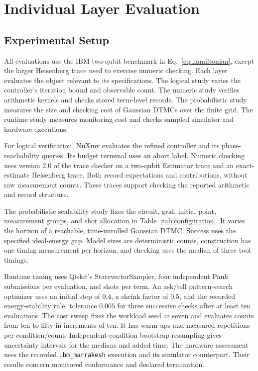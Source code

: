 \documentclass[conference]{IEEEtran}
\begin{document}
\section{Individual Layer Evaluation}
\label{sec:individual}
\subsection{Experimental Setup}
All evaluations use the IBM two-qubit benchmark in Eq.~\eqref{eq:hamiltonian}, except the larger Heisenberg trace used to exercise numeric checking. Each layer evaluates the object relevant to its specifications. The logical study varies the controller's iteration bound and observable count. The numeric study verifies arithmetic kernels and checks stored term-level records. The probabilistic study measures the size and checking cost of Gaussian DTMCs over the finite grid. The runtime study measures monitoring cost and checks sampled simulator and hardware executions.

For logical verification, NuXmv evaluates the refined controller and its phase-reachability queries. Its budget terminal uses an abort label. Numeric checking uses version 2.0 of the trace checker on a two-qubit Estimator trace and an exact-estimate Heisenberg trace. Both record expectations and contributions, without raw measurement counts. These traces support checking the reported arithmetic and record structure.

The probabilistic scalability study fixes the circuit, grid, initial point, measurement groups, and shot allocation in Table~\ref{tab:configuration}. It varies the horizon of a reachable, time-unrolled Gaussian DTMC. Success uses the specified ideal-energy gap. Model sizes are deterministic counts, construction has one timing measurement per horizon, and checking uses the median of three tool timings.

Runtime timing uses Qiskit's StatevectorSampler, four independent Pauli submissions per evaluation, and \ShotsPerGroup shots per term. An ask/tell pattern-search optimizer uses an initial step of $0.4$, a shrink factor of $0.5$, and the recorded energy-stability rule: tolerance $0.005$ for three successive checks after at least ten evaluations. The cost sweep fixes the workload seed at seven and evaluates counts from ten to fifty in increments of ten. It has \TimingWarmupsPerCell warm-ups and \TimingRepetitions measured repetitions per condition/count. Independent-condition bootstrap resampling gives uncertainty intervals for the medians and added time. The hardware assessment uses the recorded \texttt{ibm\_marrakesh} execution and its simulator counterpart. Their results concern monitored conformance and declared termination.
\end{document}
